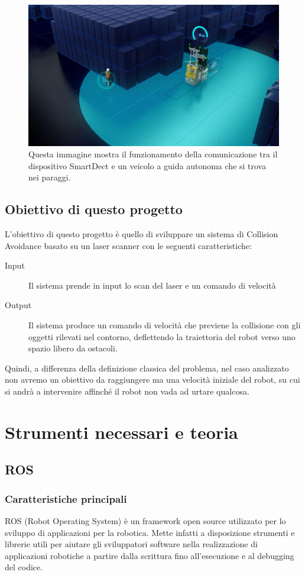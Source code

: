 \documentclass[Lau, binding=0.6cm, oneside]{sapthesis}
\begin{document}
\begin{figure}[H]
    \centering
    \includegraphics[width=12.5cm]{smart_dect.png}
    \caption{Questa immagine mostra il funzionamento della comunicazione tra il dispositivo SmartDect e un veicolo a guida autonoma che si trova nei paraggi.}
    \label{fig:smart_dect}
\end{figure}

\section{Obiettivo di questo progetto}
L'obiettivo di questo progetto è quello di sviluppare un sistema di Collision Avoidance basato su un laser scanner con le seguenti caratteristiche:
\begin{description}
	\item[Input] Il sistema prende in input lo scan del laser e un comando di velocità
	\item[Output] Il sistema produce un comando di velocità che previene la collisione con gli oggetti rilevati nel contorno, deflettendo la traiettoria del robot verso uno spazio libero da ostacoli.
\end{description}
Quindi, a differenza della definizione classica del problema, nel caso analizzato non avremo un obiettivo da raggiungere ma una velocità iniziale del robot, su cui si andrà a intervenire affinché il robot non vada ad urtare qualcosa.

\chapter{Strumenti necessari e teoria}
\section{ROS}
\subsection{Caratteristiche principali}
ROS (Robot Operating System) è un framework open source utilizzato per lo sviluppo di applicazioni per la robotica.
Mette infatti a disposizione strumenti e librerie utili per aiutare gli sviluppatori software nella realizzazione di applicazioni robotiche a partire dalla scrittura fino all’esecuzione e al debugging del codice.
\end{document}
